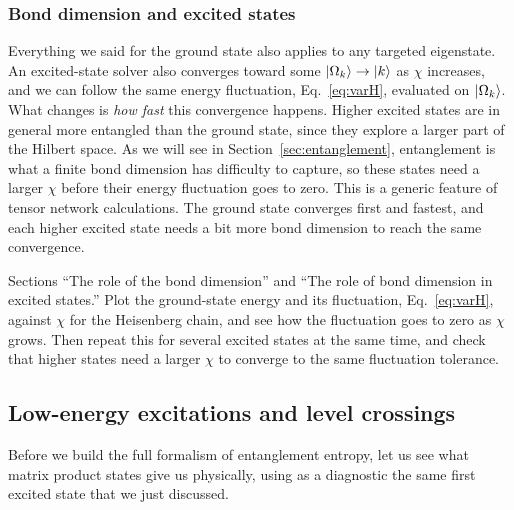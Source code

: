 \documentclass[lecture_notes.tex]{subfiles}
\begin{document}
\subsubsection{Bond dimension and excited states}
Everything we said for the ground state also applies to any targeted eigenstate. An excited-state
solver also converges toward some $\ket{\Omega_k}\to\ket{k}$ as $\chi$ increases, and we can follow
the same energy fluctuation, Eq.~\eqref{eq:varH}, evaluated on $\ket{\Omega_k}$. What changes is
\emph{how fast} this convergence happens. Higher excited states are in general more entangled than
the ground state, since they explore a larger part of the Hilbert space. As we will see in
Section~\ref{sec:entanglement}, entanglement is what a finite bond dimension has difficulty to
capture, so these states need a larger $\chi$ before their energy fluctuation goes to zero. This
is a generic feature of tensor network calculations. The ground state converges first and fastest,
and each higher excited state needs a bit more bond dimension to reach the same convergence.

\begin{notebook}
Sections ``The role of the bond dimension'' and ``The role of bond dimension in excited states.''
Plot the ground-state energy and its fluctuation, Eq.~\eqref{eq:varH}, against $\chi$ for the
Heisenberg chain, and see how the fluctuation goes to zero as $\chi$ grows. Then repeat this for
several excited states at the same time, and check that higher states need a larger $\chi$ to
converge to the same fluctuation tolerance.
\end{notebook}

\subsection{Low-energy excitations and level crossings}
Before we build the full formalism of entanglement entropy, let us see what matrix product states
give us physically, using as a diagnostic the same first excited state that we just discussed.
\end{document}
